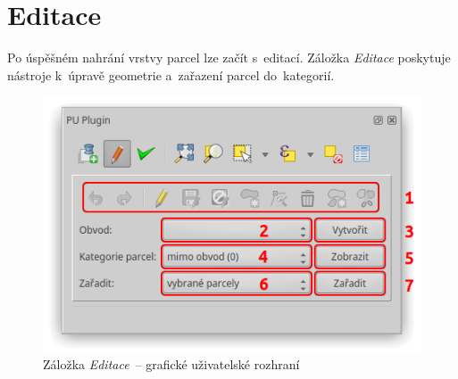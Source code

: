 \newpage

\section{Editace}
\label{manual_editace}

Po úspěšném nahrání vrstvy parcel lze začít s~editací. Záložka \textit{Editace} poskytuje nástroje k~úpravě geometrie a~zařazení parcel do~kategorií.

	\begin{figure}[H]
		\centering
		\includegraphics[width=.55\textwidth]{./pictures/editace_gui.png}
		\caption[Záložka \textit{Editace}~– grafické uživatelské rozhraní]{Záložka \textit{Editace}~– grafické uživatelské rozhraní}
		\label{fig:manual_editace_gui}
 	\end{figure}

